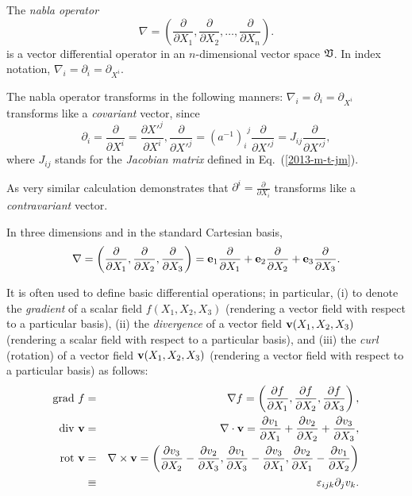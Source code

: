 The {\em nabla operator}
\begin{equation}
\nabla =\left(
\frac{\partial }{\partial X_1},
\frac{\partial }{\partial X_2},
\ldots ,
\frac{\partial }{\partial X_n}
\right).
\end{equation}
is a vector differential operator in an $n$-dimensional vector space $\frak V$.
In index notation, $\nabla_i  =\partial_i =\partial_{X^i}$.

The nabla operator transforms in the following manners:
$\nabla_i  =\partial_i =\partial_{X^i}$ transforms like a {\em covariant} vector, since
\begin{equation}
\partial_i =
\frac{\partial }{\partial X^i}
=
\frac{\partial {X'}^j}{\partial X^i},
\frac{\partial }{\partial {X'}^j}
=
{{(a^{-1})}_i}^j
\frac{\partial }{\partial {X'}^j}
=
J_{ij}
\frac{\partial }{\partial {X'}^j},
\end{equation}
where $J_{ij}$ stands for the {\em  Jacobian matrix} defined in Eq.~(\ref{2013-m-t-jm}).

As very similar calculation demonstrates that $\partial^i=\frac{\partial }{\partial X_i}$ transforms like a {\em contravariant} vector.


In three dimensions and in the standard Cartesian basis,
\begin{equation}
\nabla = \left(
\frac{\partial }{\partial X_1},
\frac{\partial }{\partial X_2},
\frac{\partial }{\partial X_3}
\right)
={\bf e}_1\frac{\partial }{\partial X_1}
+{\bf e}_2\frac{\partial }{\partial X_2}
+{\bf e}_3\frac{\partial }{\partial X_3}
.
\end{equation}


It is often used to define basic differential operations;
in particular, (i) to denote the {\em gradient} of a scalar field $f(X_1,X_2,X_3)$ (rendering a vector field with respect to a particular basis),
(ii) the {\em divergence} of a vector field ${\bf v}(X_1,X_2,X_3)$
(rendering a scalar field with respect to a particular basis), and
(iii) the {\em curl} (rotation) of a vector field  ${\bf v}(X_1,X_2,X_3)$ (rendering a vector field with respect to a particular basis)
as follows:
\begin{eqnarray}
\textrm{grad } f &=& \nabla f = \left(
\frac{\partial f}{\partial X_1},
\frac{\partial f}{\partial X_2},
\frac{\partial f}{\partial X_3}
\right)  ,\\
\textrm{div }  {\bf v} &=& \nabla \cdot {\bf v} =
\frac{\partial v_1}{\partial X_1}+
\frac{\partial v_2}{\partial X_2}+
\frac{\partial v_3}{\partial X_3}
  ,\\
\textrm{rot } {\bf v} &=& \nabla \times {\bf v} = \left(
\frac{\partial v_3}{\partial X_2}-
\frac{\partial v_2}{\partial X_3}
,
\frac{\partial v_1}{\partial X_3}-
\frac{\partial v_3}{\partial X_1}
,
\frac{\partial v_2}{\partial X_1}-
\frac{\partial v_1}{\partial X_2}
\right)          \\
&\equiv& \varepsilon_{ijk} \partial_j v_k.
\end{eqnarray}

